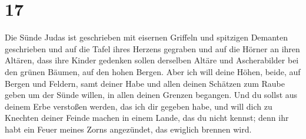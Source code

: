 \hypertarget{section-16}{%
\section{17}\label{section-16}}

 Die Sünde Judas ist geschrieben mit eisernen Griffeln und
spitzigen Demanten geschrieben und auf die Tafel ihres Herzens gegraben
und auf die Hörner an ihren Altären,  dass ihre Kinder
gedenken sollen derselben Altäre und Ascherabilder bei den grünen
Bäumen, auf den hohen Bergen.  Aber ich will deine Höhen,
beide, auf Bergen und Feldern, samt deiner Habe und allen deinen
Schätzen zum Raube geben um der Sünde willen, in allen deinen Grenzen
begangen.  Und du sollst aus deinem Erbe verstoßen werden,
das ich dir gegeben habe, und will dich zu Knechten deiner Feinde machen
in einem Lande, das du nicht kennst; denn ihr habt ein Feuer meines
Zorns angezündet, das ewiglich brennen wird.


